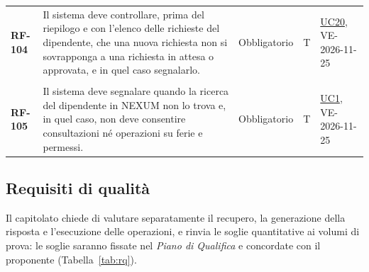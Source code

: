 \documentclass[documento]{gpt}
\begin{document}
{\begin{longtable}{@{}>{\raggedright\arraybackslash}p{1.35cm}>{\raggedright\arraybackslash}p{7.3cm}>{\raggedright\arraybackslash}p{1.9cm}>{\centering\arraybackslash}p{0.75cm}>{\raggedright\arraybackslash}p{3.1cm}@{}}
\leavevmode\hypertarget{req:RF-104}{\textbf{RF-104}} & Il sistema deve controllare, prima del riepilogo e con l’elenco delle richieste del dipendente, che una nuova richiesta non si sovrapponga a una richiesta in attesa o approvata, e in quel caso segnalarlo. & Obbligatorio & T & \hyperref[uc:registra]{UC20}, \mbox{VE-2026-11-25} \\
\addlinespace[3pt]\multicolumn{5}{@{}l}{\textbf{\sffamily Accesso e profilo}} \\ \addlinespace[2pt]
\leavevmode\hypertarget{req:RF-105}{\textbf{RF-105}} & Il sistema deve segnalare quando la ricerca del dipendente in NEXUM non lo trova e, in quel caso, non deve consentire consultazioni né operazioni su ferie e permessi. & Obbligatorio & T & \hyperref[uc:login]{UC1}, \mbox{VE-2026-11-25} \\
\end{longtable}}

\subsection{Requisiti di qualità}\label{sec:rq}

Il capitolato chiede di valutare separatamente il recupero, la generazione della
risposta e l'esecuzione delle operazioni, e rinvia le soglie quantitative ai
volumi di prova: le soglie saranno fissate nel \textit{Piano di Qualifica} e
concordate con il proponente (Tabella~\ref{tab:rq}).
\end{document}
